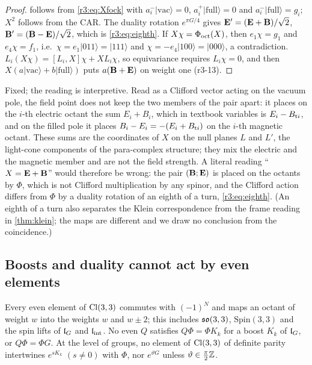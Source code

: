 \begin{proof}
 follows from \cref{r3:eq:Xfock} with $a^-_i|\mathrm{vac}\rangle=0$, $a^+_i|\mathrm{full}\rangle=0$ and $a^-_i|\mathrm{full}\rangle=g_i$; $X^2$ follows from the
CAR. The duality rotation $e^{\pi G/4}$ gives $\mathbf E'=(\mathbf E+\mathbf B)/\sqrt2$, $\mathbf B'=(\mathbf B-\mathbf E)/\sqrt2$, which is \cref{r3:eq:eighth}. If $X\chi=\Phi_{\rm oct}(X)$, then
$e_1\chi=g_1$ and $e_4\chi=f_1$, i.e.\ $\chi=e_1|011\rangle=|111\rangle$ and $\chi=-e_4|100\rangle=|000\rangle$, a contradiction. $L_i(X\chi)=[L_i,X]\chi+XL_i\chi$, so
equivariance requires $L_i\chi=0$, and then $X(a|\mathrm{vac}\rangle+b|\mathrm{full}\rangle)$ puts $a(\mathbf B+\mathbf E)$ on weight one (r3-13).
\end{proof}

Fixed; the reading is interpretive. Read as a Clifford vector acting on the vacuum pole, the field point does not keep the two members of
the pair apart: it places on the $i$-th electric octant the sum $E_i+B_i$, which in textbook variables is $E_i-B_{{\rm t}i}$, and on the
filled pole it places $B_i-E_i=-(E_i+B_{{\rm t}i})$ on the $i$-th magnetic octant. These sums are the coordinates of $X$ on the null planes
$L$ and $L'$, the light-cone components of the para-complex structure; they mix the electric and the magnetic member and are not the
field strength. A literal reading ``$X=\mathbf E+\mathbf B$'' would therefore be wrong: the pair $(\mathbf B;\mathbf E)$ is placed on the octants by $\Phi$, which is
not Clifford multiplication by any spinor, and the Clifford action differs from $\Phi$ by a duality rotation of an eighth of a turn,
\cref{r3:eq:eighth}. (An eighth of a turn also separates the Klein correspondence from the frame reading in \cref{thm:klein}; the
maps are different and we draw no conclusion from the coincidence.)

\subsection{Boosts and duality cannot act by even elements}
\label{r3:sec:boosts}

\begin{theorem}
\label{r3:thm:noeven}
Every even element of $\mathrm{Cl}(3,3)$ commutes with $(-1)^N$ and maps an octant of weight $w$ into the weights $w$ and $w\pm2$; this includes $\mathfrak{so}(3,3)$,
$\mathrm{Spin}(3,3)$ and the spin lifts of $\mathfrak l_G$ and $\mathfrak l_{\rm int}$. No even $Q$ satisfies $Q\Phi=\Phi K_k$ for a boost $K_k$ of $\mathfrak l_G$, or $Q\Phi=\Phi G$.
At the level of groups, no element of $\mathrm{Cl}(3,3)$ of definite parity intertwines $e^{sK_k}$ $(s\neq0)$ with $\Phi$, nor $e^{\vartheta G}$ unless
$\vartheta\in\tfrac\pi2\mathbb{Z}$.
\end{theorem}

